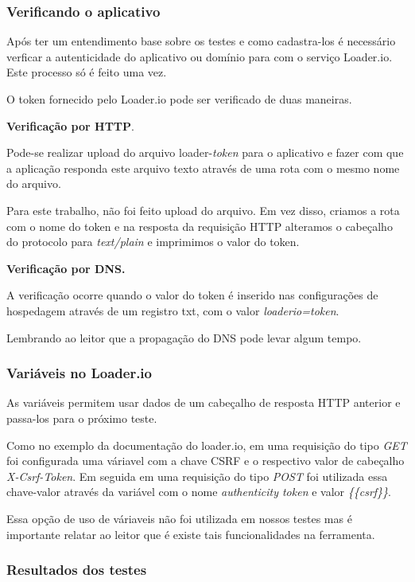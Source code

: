 \subsubsection{Verificando o aplicativo}

  Após ter um entendimento base sobre os testes e como cadastra-los é necessário verficar a autenticidade do 
  aplicativo ou domínio para com o serviço Loader.io. Este processo só é feito uma vez. 
  
  O token fornecido pelo Loader.io pode ser verificado de duas maneiras.
  
  \textbf{Verificação por HTTP}.
  
  Pode-se realizar upload do arquivo loader-\textit{token} para o aplicativo e fazer com que a aplicação
  responda este arquivo texto através de uma rota com o mesmo nome do arquivo. 
  
  Para este trabalho, não foi feito upload do arquivo. Em vez disso, criamos a rota com o nome do token e
  na resposta da requisição \ac{HTTP} alteramos o cabeçalho do protocolo para \textit{text/plain} e imprimimos
  o valor do token.
  
  \textbf{Verificação por DNS.}
  
  A verificação ocorre quando o valor do token é inserido nas configurações de hospedagem através de um
  registro txt, com o valor \textit{loaderio=token}.
  
  Lembrando ao leitor que a propagação do \ac{DNS} pode levar algum tempo.
  
\subsubsection{Variáveis no Loader.io}

  As variáveis permitem usar dados de um cabeçalho de resposta \ac{HTTP} anterior e passa-los para o próximo
  teste.
  
  Como no exemplo da documentação do loader.io, em uma requisição do tipo \textit{GET} foi configurada uma váriavel
  com a chave \ac{CSRF} e o respectivo valor de cabeçalho \textit{X-Csrf-Token}. Em seguida em uma requisição 
  do tipo \textit{POST} foi utilizada essa chave-valor através da variável com o nome \textit{authenticity token} e valor
  \textit{\{\{csrf\}\}}.
  
  Essa opção de uso de váriaveis não foi utilizada em nossos testes mas é importante relatar ao leitor que
  é existe tais funcionalidades na ferramenta.

  
\subsubsection{Resultados dos testes}

